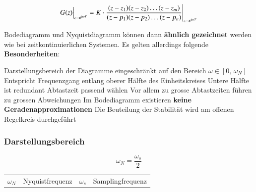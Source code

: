 \vspace{-0.2cm}

$$ G(z) \Big|_{z = e^{\mathrm{j} \omega T}} = K \cdot \frac{(z - z_1) (z - z_2) \ldots (z - z_m)}{(z - p_1) (z - p_2) \ldots (z - p_n)} \Bigg|_{z = e^{\mathrm{j} \omega T}} $$

Bodediagramm und Nyquistdiagramm können dann \textbf{ähnlich gezeichnet} werden wie bei zeitkontinuierlichen Systemen. 
Es gelten allerdings folgende \textbf{Besonderheiten}:

\smallskip

\begin{outline}
    \1 Darstellungsbereich der Diagramme eingeschränkt auf den Bereich $\omega \in \left[0, \, \omega_N \right]$
        \2 Entspricht Frequenzgang entlang oberer Hälfte des Einheitskreises
        \2 Untere Hälfte ist redundant
    \1 Abtastzeit passend wählen
        \2 Vor allem zu grosse Abtastzeiten führen zu grossen Abweichungen
    \1 Im Bodediagramm existieren \textbf{keine Geradenapproximationen}
    \1 Die Beuteilung der Stabilität wird am offenen Regelkreis durchgeführt
\end{outline}


\subsubsection{Darstellungsbereich}

\begin{minipage}[c]{0.25\columnwidth}
    $$ \omega_N = \frac{\omega_s}{2} $$
\end{minipage}
\hfill
\begin{minipage}[c]{0.7\columnwidth}
    \begin{tabular}{ll|ll}
        $\omega_N$  & Nyquistfrequenz   & $\omega_s$  & Samplingfrequenz  \\
    \end{tabular}
\end{minipage}


